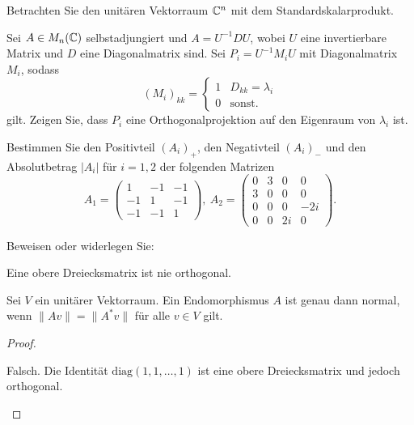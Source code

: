 \begin{Problem}
	Betrachten Sie den unitären Vektorraum $\mathbb{C}^n$ mit dem Standardskalarprodukt.
	\begin{parts}
		\tem Sei $A\in M_n(\mathbb{C})$ selbstadjungiert und $A=U^{-1}DU$, wobei $U$ eine invertierbare Matrix und $D$ eine Diagonalmatrix sind. Sei $P_i=U^{-1}M_iU$ mit Diagonalmatrix $M_i$, sodass
		\[
			(M_i)_{kk}=\begin{cases}
				1 & D_{kk}=\lambda_i\\
				0 & \text{sonst.}
			\end{cases}
		\]
		gilt. Zeigen Sie, dass $P_i$ eine Orthogonalprojektion auf den Eigenraum von $\lambda_i$ ist.
		\item Bestimmen Sie den Positivteil $(A_i)_+$, den Negativteil $(A_i)_{-}$ und den Absolutbetrag $|A_i|$ f\"{u}r $i=1,2$ der folgenden Matrizen
			\[
				A_1=\begin{pmatrix} 1 & -1 & -1 \\ -1 & 1 & -1 \\ -1 & -1 & 1 \end{pmatrix},~A_2=\begin{pmatrix} 0 & 3 & 0 & 0 \\ 3 & 0 & 0 & 0 \\ 0 & 0 & 0 & -2i \\ 0 & 0 & 2i & 0 \end{pmatrix} 
			.\] 
	\end{parts}
\end{Problem}

\begin{Problem}
	Beweisen oder widerlegen Sie:
	\begin{parts}
	\item Eine obere Dreiecksmatrix ist nie orthogonal.
	\item Sei $V$ ein unitärer Vektorraum. Ein Endomorphismus $A$ ist genau dann normal, wenn $\|Av\|=\|A^*v\|$ f\"{u}r alle $v\in V$ gilt.  
	\end{parts}
\end{Problem}

\begin{proof}
	\begin{parts}
	\item Falsch. Die Identität $\text{diag}(1,1,\dots, 1)$ ist eine obere Dreiecksmatrix und jedoch orthogonal.
	\end{parts}
\end{proof}

